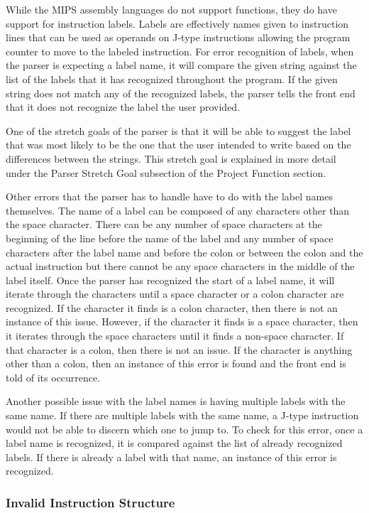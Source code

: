 \documentclass[
    parskip=half,
    fontsize=12pt,
    titlepage=firstiscover,
    toc=bibliography,
    numbers=endperiod
]{scrartcl}
\begin{document}
While the MIPS assembly languages do not support functions, they do have
support for instruction labels. Labels are effectively names given to
instruction lines that can be used as operands on J-type instructions
allowing the program counter to move to the labeled instruction. For
error recognition of labels, when the parser is expecting a label name,
it will compare the given string against the list of the labels that it
has recognized throughout the program. If the given string does not
match any of the recognized labels, the parser tells the front end that
it does not recognize the label the user provided.

One of the stretch goals of the parser is that it will be able to
suggest the label that was most likely to be the one that the user
intended to write based on the differences between the strings. This
stretch goal is explained in more detail under the Parser Stretch Goal
subsection of the Project Function section.

Other errors that the parser has to handle have to do with the label
names themselves. The name of a label can be composed of any characters
other than the space character. There can be any number of space
characters at the beginning of the line before the name of the label and
any number of space characters after the label name and before the colon
or between the colon and the actual instruction but there cannot be any
space characters in the middle of the label itself. Once the parser has
recognized the start of a label name, it will iterate through the
characters until a space character or a colon character are recognized.
If the character it finds is a colon character, then there is not an
instance of this issue. However, if the character it finds is a space
character, then it iterates through the space characters until it finds
a non-space character. If that character is a colon, then there is not
an issue. If the character is anything other than a colon, then an
instance of this error is found and the front end is told of its
occurrence.

Another possible issue with the label names is having multiple labels
with the same name. If there are multiple labels with the same name, a
J-type instruction would not be able to discern which one to jump to. To
check for this error, once a label name is recognized, it is compared
against the list of already recognized labels. If there is already a
label with that name, an instance of this error is recognized.

\subsubsection{Invalid Instruction Structure}
\end{document}
